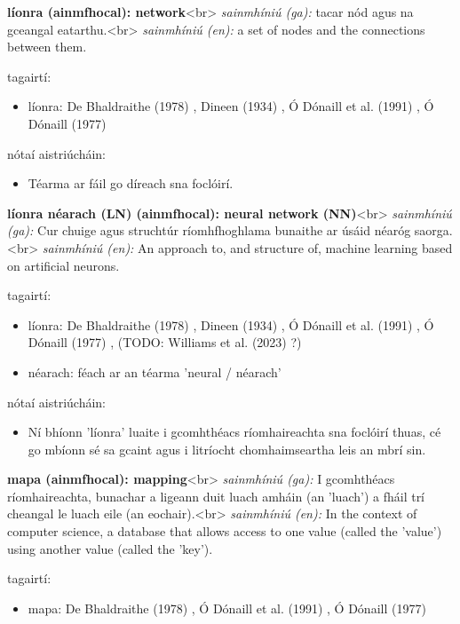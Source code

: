 \documentclass{article}
\begin{document}
\textbf{líonra (ainmfhocal): network}<br>
\textit{sainmhíniú (ga):} tacar nód agus na gceangal eatarthu.<br>
\textit{sainmhíniú (en):} a set of nodes and the connections between them.

tagairtí:
\begin{itemize}
	\item líonra: De Bhaldraithe (1978) \cite{de-bhaldraithe}, Dineen (1934) \cite{dineen}, Ó Dónaill et al. (1991) \cite{focloir-beag}, Ó Dónaill (1977) \cite{odonaill}
\end{itemize}

nótaí aistriúcháin:
\begin{itemize}
	\item Téarma ar fáil go díreach sna foclóirí.
\end{itemize}


\textbf{líonra néarach (LN) (ainmfhocal): neural network (NN)}<br>
\textit{sainmhíniú (ga):} Cur chuige agus struchtúr ríomhfhoghlama bunaithe ar úsáid néaróg saorga.<br>
\textit{sainmhíniú (en):} An approach to, and structure of, machine learning based on artificial neurons.

tagairtí:
\begin{itemize}
	\item líonra: De Bhaldraithe (1978) \cite{de-bhaldraithe}, Dineen (1934) \cite{dineen}, Ó Dónaill et al. (1991) \cite{focloir-beag}, Ó Dónaill (1977) \cite{odonaill}, (TODO: Williams et al. (2023) \cite{storchiste}?)
	\item néarach: féach ar an téarma 'neural / néarach'
\end{itemize}

nótaí aistriúcháin:
\begin{itemize}
	\item Ní bhíonn 'líonra' luaite i gcomhthéacs ríomhaireachta sna foclóirí thuas, cé go mbíonn sé sa gcaint agus i litríocht chomhaimseartha leis an mbrí sin.
\end{itemize}


\textbf{mapa (ainmfhocal): mapping}<br>
\textit{sainmhíniú (ga):} I gcomhthéacs ríomhaireachta, bunachar a ligeann duit luach amháin (an 'luach') a fháil trí cheangal le luach eile (an eochair).<br>
\textit{sainmhíniú (en):} In the context of computer science, a database that allows access to one value (called the 'value') using another value (called the 'key').

tagairtí:
\begin{itemize}
	\item mapa: De Bhaldraithe (1978) \cite{de-bhaldraithe}, Ó Dónaill et al. (1991) \cite{focloir-beag}, Ó Dónaill (1977) \cite{odonaill}
\end{itemize}
\end{document}
